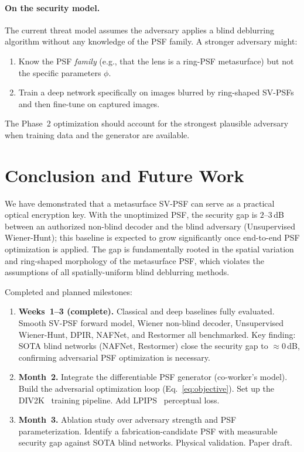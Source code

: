 \documentclass[11pt, a4paper]{article}
\begin{document}
\paragraph{On the security model.}
The current threat model assumes the adversary applies a blind deblurring
algorithm without any knowledge of the PSF family.  A stronger adversary
might:
\begin{enumerate}
  \item Know the PSF \emph{family} (e.g., that the lens is a ring-PSF
        metasurface) but not the specific parameters $\phi$.
  \item Train a deep network specifically on images blurred by ring-shaped
        SV-PSFs and then fine-tune on captured images.
\end{enumerate}
The Phase~2 optimization should account for the strongest plausible adversary
when training data and the generator are available.

\section{Conclusion and Future Work}
\label{sec:conclusion}

We have demonstrated that a metasurface SV-PSF can serve as a practical
optical encryption key.  With the unoptimized PSF, the security gap is
$2$--$3$\,dB between an authorized non-blind decoder and the blind
adversary (Unsupervised Wiener-Hunt); this baseline is expected to grow
significantly once end-to-end PSF optimization is applied.
The gap is fundamentally rooted in the spatial variation and
ring-shaped morphology of the metasurface PSF, which violates the assumptions
of all spatially-uniform blind deblurring methods.

Completed and planned milestones:
\begin{enumerate}
  \item \textbf{Weeks~1--3 (complete).}
        Classical and deep baselines fully evaluated.
        Smooth SV-PSF forward model, Wiener non-blind decoder, Unsupervised
        Wiener-Hunt, DPIR, NAFNet, and Restormer all benchmarked.
        Key finding: SOTA blind networks (NAFNet, Restormer) close the security
        gap to $\approx 0$\,dB, confirming adversarial PSF optimization is necessary.
  \item \textbf{Month~2.}
        Integrate the differentiable PSF generator (co-worker's model).
        Build the adversarial optimization loop
        (Eq.~\ref{eq:objective}).
        Set up the DIV2K~\cite{agustsson2017div2k} training pipeline.
        Add LPIPS~\cite{zhang2018lpips} perceptual loss.
  \item \textbf{Month~3.}
        Ablation study over adversary strength and PSF parameterization.
        Identify a fabrication-candidate PSF with measurable security gap
        against SOTA blind networks.
        Physical validation.  Paper draft.
\end{enumerate}


\end{document}
